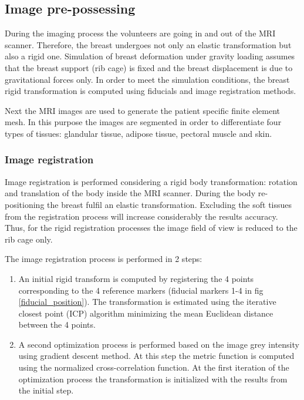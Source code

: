 \subsection{Image pre-possessing}
During the imaging process the volunteers are going in and out of the MRI scanner. Therefore, the breast undergoes not only an elastic transformation but also a rigid one. Simulation of breast deformation under gravity loading assumes that the breast support (rib cage) is fixed and the breast displacement is due to gravitational forces only. In order to meet the simulation conditions, the breast rigid transformation is computed using fiducials and image registration methods. 

Next the MRI images are used to generate the patient specific finite element mesh. In this purpose the images are segmented in order to differentiate four types of tissues: glandular tissue, adipose tissue, pectoral muscle and skin.   

\subsubsection*{Image registration}
Image registration is performed considering a rigid body transformation: rotation and translation of the body inside the MRI scanner.  During the body re-positioning the breast fulfil an elastic transformation. Excluding the soft tissues from the registration process will increase considerably the results accuracy. Thus, for the rigid registration processes the image field of view is reduced to the rib cage only. 

The image registration process is performed in 2 steps:
\begin{enumerate}
\item An initial rigid transform is computed by registering the 4 points corresponding to the 4 reference markers (fiducial markers 1-4 in fig \ref{fiducial_position}). The transformation is estimated using the iterative closest point (ICP) algorithm minimizing the mean Euclidean distance between the 4 points.
\item A second optimization process is performed based on the image grey intensity using gradient descent method. At this step the metric function is computed using the normalized cross-correlation function. At the first iteration of the optimization process the transformation is initialized with the results from the initial step.

\end{enumerate}

